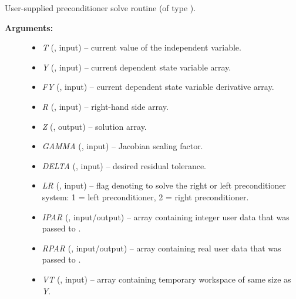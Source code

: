 \documentclass[letterpaper,10pt,english]{sphinxmanual}
\begin{document}
\begin{fulllineitems}
\label{f_interface/Usage:f/_/FARKPSOL}
User-supplied preconditioner solve routine (of type
{\hyperref[c_interface/User_supplied:c.ARKSpilsPrecSolveFn]{\emph{}}}).
\begin{description}
\item[{\textbf{Arguments:}}] \leavevmode\begin{itemize}
\item {} 
\emph{T} (, input) -- current value of the independent variable.

\item {} 
\emph{Y} (, input) -- current dependent state variable array.

\item {} 
\emph{FY} (, input) -- current dependent state variable derivative array.

\item {} 
\emph{R} (, input) -- right-hand side array.

\item {} 
\emph{Z} (, output) -- solution array.

\item {} 
\emph{GAMMA} (, input) -- Jacobian scaling factor.

\item {} 
\emph{DELTA} (, input) -- desired residual tolerance.

\item {} 
\emph{LR} (, input) -- flag denoting to solve the right or left preconditioner
system: 1 = left preconditioner, 2 = right preconditioner.

\item {} 
\emph{IPAR} (, input/output) -- array containing integer user data that was passed to
{\hyperref[f_interface/Usage:f/_/FARKMALLOC]{\emph{}}}.

\item {} 
\emph{RPAR} (, input/output) -- array containing real user data that was passed to
{\hyperref[f_interface/Usage:f/_/FARKMALLOC]{\emph{}}}.

\item {} 
\emph{VT} (, input) -- array containing temporary workspace of same size as \emph{Y}.


\end{itemize}
\end{description}
\end{fulllineitems}
\end{document}
